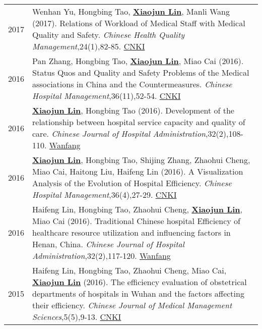 \documentclass[a4paper,10pt]{article}
\begin{document}
\begin{longtable}{r p{13cm}}
2017 & Wenhan Yu, Hongbing Tao, \underline{\textbf{Xiaojun Lin}}, Manli Wang (2017). Relations of Workload of Medical Staff with Medical Quality and Safety. \emph{Chinese Health Quality Management},24(1),82-85. \href{http://kns.cnki.net/KCMS/detail/detail.aspx?dbcode=CJFQ&dbname=CJFDLAST2017&filename=WSJG201701013&v=MDI5NThSOGVYMUx1eFlTN0RoMVQzcVRyV00xRnJDVVJMS2VadVp0RmlEbVY3M09NajdCYWJHNEg5Yk1ybzlFWjQ=}{CNKI}\\
2016 & Pan Zhang, Hongbing Tao,  \underline{\textbf{Xiaojun Lin}}, Miao Cai (2016). Status Quos and Quality and Safety Problems of the Medical associations in China and the Countermeasures. \emph{Chinese Hospital Management},36(11),52-54. \href{http://kns.cnki.net/KCMS/detail/detail.aspx?dbcode=CJFQ&dbname=CJFDLAST2016&filename=YYGL201611027&v=MjM5Mjl1WnNGaXZtVTcvS1BEVE1Zckc0SDlmTnJvOUhZNFI4ZVgxTHV4WVM3RGgxVDNxVHJXTTFGckNVUkxLZVo=}{CNKI}\\
2016 & \underline{\textbf{Xiaojun Lin}}, Hongbing Tao (2016). Development of the relationship between hospital service capacity and quality of care. \emph{Chinese Journal of Hospital Administration},32(2),108-110. \href{http://www.wanfangdata.com.cn/details/detail.do?_type=perio&id=zhyygl201602010}{Wanfang}\\
2016 & \underline{\textbf{Xiaojun Lin}}, Hongbing Tao, Shijing Zhang, Zhaohui Cheng, Miao Cai, Haitong Liu, Haifeng Lin (2016). A Visualization Analysis of the Evolution of Hospital Efficiency. \emph{Chinese Hospital Management},36(4),27-29. \href{http://kns.cnki.net/KCMS/detail/detail.aspx?dbcode=CJFQ&dbname=CJFDLAST2016&filename=YYGL201604015&v=MjM5ODRSTEtlWnVadEZpRG5VNy9MUERUTVlyRzRIOWZNcTQ5RVlZUjhlWDFMdXhZUzdEaDFUM3FUcldNMUZyQ1U=}{CNKI}\\
2016 & Haifeng Lin, Hongbing Tao, Zhaohui Cheng, \underline{\textbf{Xiaojun Lin}}, Miao Cai (2016). Traditional Chinese hospital Efficiency of healthcare resource utilization and influencing factors in Henan, China. \emph{Chinese Journal of Hospital Administration},32(2),117-120. \href{http://www.wanfangdata.com.cn/details/detail.do?_type=perio&id=zhyygl201602013}{Wanfang}\\
2015 & Haifeng Lin, Hongbing Tao, Zhaohui Cheng, Miao Cai, \underline{\textbf{Xiaojun Lin}} (2016). The efficiency evaluation of obstetrical departments of hospitals in Wuhan and the factors affecting their efficiency. \emph{Chinese Journal of Medical Management Sciences},5(5),9-13. \href{http://kns.cnki.net/KCMS/detail/detail.aspx?dbcode=CJFQ&dbname=CJFDLAST2015&filename=YLGL201505004&v=MjkxODIxTHV4WVM3RGgxVDNxVHJXTTFGckNVUkxLZVp1WnNGaXZtVkx2QVBDSE1Zckc0SDlUTXFvOUZZSVI4ZVg=}{CNKI}\\

\end{longtable}
\end{document}

